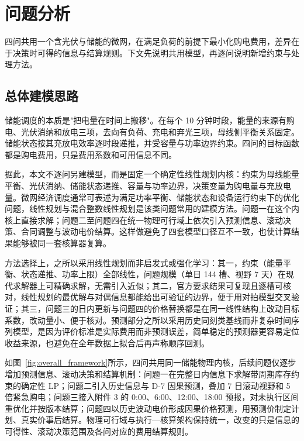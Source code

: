 \documentclass[withoutpreface,bwprint]{cumcmthesis}
\begin{document}
\section{问题分析}

四问共用一个含光伏与储能的微网，在满足负荷的前提下最小化购电费用，差异在于决策时可得的信息与结算规则。下文先说明共用模型，再逐问说明新增约束与处理方法。

\subsection{总体建模思路}

储能调度的本质是"把电量在时间上搬移"。在每个 10 分钟时段，能量的来源有购电、光伏消纳和放电三项，去向有负荷、充电和弃光三项，母线侧平衡关系固定。储能状态按其充放电效率逐时段递推，并受容量与功率边界约束。四问的目标函数都是购电费用，只是费用系数和可用信息不同。

据此，本文不逐问另建模型，而是固定一个确定性线性规划内核：约束为母线能量平衡、光伏消纳、储能状态递推、容量与功率边界，决策变量为购电量与充放电量。微网经济调度通常可表述为满足功率平衡、储能状态和设备运行约束下的优化问题，线性规划与混合整数线性规划是该类问题常用的建模方法\cite{boyd2004convex,si2011modeling}。问题一在这个内核上直接求解；问题二至问题四在统一物理可行域上依次引入预测信息、滚动决策、合同调整与波动电价结算。这样做避免了四套模型口径互不一致，也使计算结果能够被同一套核算器复算。

方法选择上，之所以采用线性规划而非启发式或强化学习：其一，约束（能量平衡、状态递推、功率上限）全部线性，问题规模（单日 144 槽、视野 7 天）在现代求解器上可精确求解，无需引入近似；其二，官方要求结果可复现且逐槽可核对，线性规划的最优解与对偶信息都能给出可验证的边界，便于用对拍模型交叉验证；其三，问题三的日内更新与问题四的价格替换都是在同一线性结构上改动目标系数，改动量小、便于核对。预测部分之所以采用历史同刻类基线而非复杂时间序列模型，是因为评价标准是实际费用而非预测误差，简单稳定的预测器更容易定位收益来源，也避免在全年数据上拟合后再声称顺序回测。

如图~\ref{fig:overall_framework}所示，四问共用同一储能物理内核，后续问题仅逐步增加预测信息、滚动决策和结算机制：问题一在完整日内信息下求解带周期库存约束的确定性 LP；问题二引入历史信息与 D-7 因果预测，叠加 7 日滚动视野和 5 倍紧急购电；问题三接入附件 3 的 0:00、6:00、12:00、18:00 预报，对未执行区间重优化并按版本结算；问题四以历史波动电价形成因果价格预测，用预测价制定计划、真实价事后结算。物理可行域与执行—核算架构保持统一，改变的只是信息的可得性、滚动决策范围及各问对应的费用结算规则。
\end{document}
